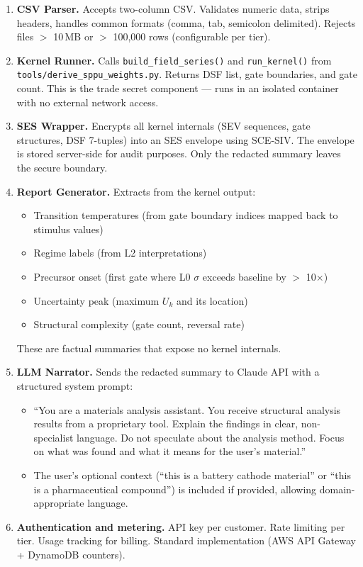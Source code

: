 \documentclass[11pt,letterpaper]{article}
\begin{document}
\begin{enumerate}
  \item \textbf{CSV Parser.} Accepts two-column CSV. Validates
    numeric data, strips headers, handles common formats (comma,
    tab, semicolon delimited). Rejects files $>$ 10\,MB or
    $>$ 100{,}000 rows (configurable per tier).

  \item \textbf{Kernel Runner.} Calls \texttt{build\_field\_series()}
    and \texttt{run\_kernel()} from
    \texttt{tools/derive\_sppu\_weights.py}. Returns DSF list,
    gate boundaries, and gate count. This is the trade secret
    component --- runs in an isolated container with no external
    network access.

  \item \textbf{SES Wrapper.} Encrypts all kernel internals (SEV
    sequences, gate structures, DSF 7-tuples) into an SES envelope
    using SCE-SIV. The envelope is stored server-side for audit
    purposes. Only the redacted summary leaves the secure boundary.

  \item \textbf{Report Generator.} Extracts from the kernel output:
    \begin{itemize}
      \item Transition temperatures (from gate boundary indices
        mapped back to stimulus values)
      \item Regime labels (from L2 interpretations)
      \item Precursor onset (first gate where L0 $\sigma$ exceeds
        baseline by $>$ 10$\times$)
      \item Uncertainty peak (maximum $U_k$ and its location)
      \item Structural complexity (gate count, reversal rate)
    \end{itemize}
    These are factual summaries that expose no kernel internals.

  \item \textbf{LLM Narrator.} Sends the redacted summary to
    Claude API with a structured system prompt:
    \begin{itemize}
      \item ``You are a materials analysis assistant. You receive
        structural analysis results from a proprietary tool. Explain
        the findings in clear, non-specialist language. Do not
        speculate about the analysis method. Focus on what was found
        and what it means for the user's material.''
      \item The user's optional context (``this is a battery cathode
        material'' or ``this is a pharmaceutical compound'') is
        included if provided, allowing domain-appropriate language.
    \end{itemize}

  \item \textbf{Authentication and metering.} API key per customer.
    Rate limiting per tier. Usage tracking for billing. Standard
    implementation (AWS API Gateway + DynamoDB counters).
\end{enumerate}
\end{document}
